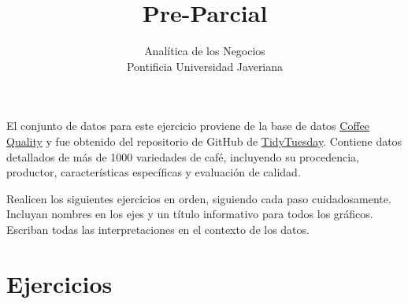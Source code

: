 \documentclass[letterpaper]{article}
\date{\vspace{-5ex}}
\begin{document}
\title{{\bf Pre-Parcial}} 
\author{Analítica de los Negocios \\
	Pontificia Universidad Javeriana}
\date{}

\maketitle 


El conjunto de datos para este ejercicio proviene de la base de datos \hyperlink{https://github.com/jldbc/coffee-quality-database}{Coffee Quality} y fue obtenido del repositorio de GitHub de \hyperlink{https://github.com/rfordatascience/tidytuesday/blob/master/data/2020/2020-07-07/readme.md}{TidyTuesday}. Contiene datos detallados de más de 1000 variedades de café, incluyendo su procedencia, productor, características específicas y evaluación de calidad.

\medskip

Realicen los siguientes ejercicios en orden, siguiendo cada paso cuidadosamente. Incluyan nombres en los ejes y un título informativo para todos los gráficos. Escriban todas las interpretaciones en el contexto de los datos.

\section{Ejercicios}
\end{document}
